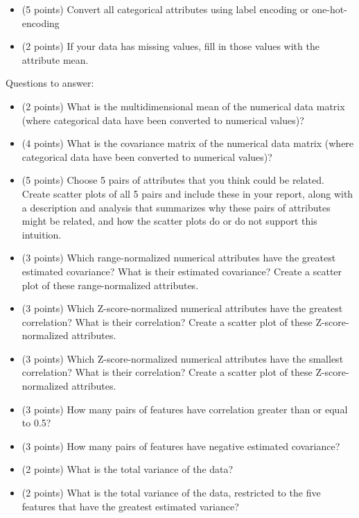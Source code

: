 \documentclass[11pt]{article}
\begin{document}
\begin{itemize}

    \item (5 points) Convert all categorical attributes using label encoding or
    one-hot-encoding

    \item (2 points) If your data has missing values, fill in those values with
    the attribute mean.

\end{itemize}

\noindent Questions to answer:
\begin{itemize}

    \item (2 points) What is the multidimensional mean of the numerical data matrix
    (where categorical data have been converted to numerical values)?

    \item (4 points) What is the covariance matrix of the numerical data matrix
    (where categorical data have been converted to numerical values)?

    \item (5 points) Choose 5 pairs of attributes that you think could be
    related. Create scatter plots of all 5 pairs and include these in your
    report, along with a description and analysis that summarizes why these
    pairs of attributes might be related, and how the scatter plots do or do not
    support this intuition.

    \item (3 points) Which range-normalized numerical attributes have the
    greatest estimated covariance? What is their estimated covariance? Create a
    scatter plot of these range-normalized attributes.

    \item (3 points) Which Z-score-normalized numerical attributes have the
    greatest correlation? What is their correlation? Create a scatter plot of
    these Z-score-normalized attributes.

    \item (3 points) Which Z-score-normalized numerical attributes have the
    smallest correlation? What is their correlation? Create a scatter plot of
    these Z-score-normalized attributes.

    \item (3 points) How many pairs of features have correlation greater than or
    equal to 0.5?

    \item (3 points) How many pairs of features have negative estimated
    covariance?

    \item (2 points) What is the total variance of the data?

    \item (2 points) What is the total variance of the data, restricted to the
    five features that have the greatest estimated variance?

\end{itemize}
\end{document}
